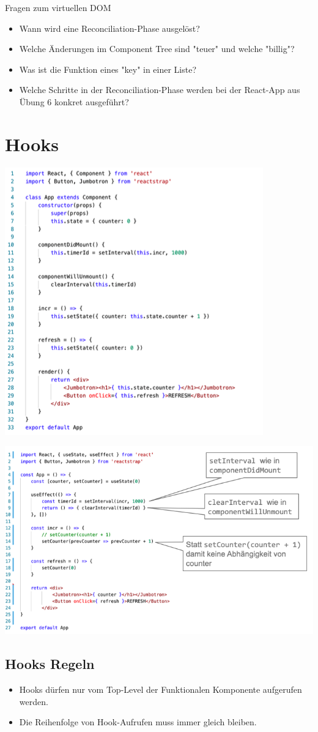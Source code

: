 Fragen zum virtuellen DOM
\begin{itemize}
	\item  Wann wird eine Reconciliation-Phase ausgelöst?
	\item  Welche Änderungen im Component Tree sind "teuer" und welche "billig"?
	\item  Was ist die Funktion eines "key" in einer Liste?
	\item Welche Schritte in der Reconciliation-Phase werden bei der React-App aus Übung 6 konkret ausgeführt?
\end{itemize}



\section{Hooks}

\includegraphics[width=0.7\columnwidth]{images/withouthooks}

\includegraphics[width=0.8\columnwidth]{images/withhooks}

\subsection{Hooks Regeln}
\begin{itemize}
	\item Hooks dürfen nur vom Top-Level der Funktionalen Komponente aufgerufen werden.
	\item Die Reihenfolge von Hook-Aufrufen muss immer gleich bleiben.
\end{itemize}
